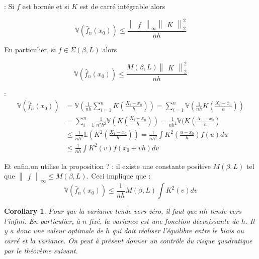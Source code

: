\documentclass[
]{book}
\newtheorem{corollary}{Corollary}[chapter]
\theoremstyle{definition}
\theoremstyle{definition}
\theoremstyle{definition}
\theoremstyle{definition}
\theoremstyle{remark}
\begin{document}
\begin{prop}: Si $f$ est bornée et si $K$ est de carré intégrable alors 

$$
\mathbb{V}(\hat {f}_n(x_0)) \leqslant \frac{\begin{Vmatrix}f\end{Vmatrix}_{\infty}\begin{Vmatrix}K\end{Vmatrix}^2_2}{nh}
$$

En particulier, si $f \in \Sigma(\beta,L)$ alors

$$
\mathbb{V}(\hat {f}_n(x_0)) \leqslant \frac{M(\beta, L)\begin{Vmatrix}K\end{Vmatrix}^2_2}{nh}
$$

\end{prop}
\begin{demo}:
$$
\begin{aligned}
\mathbb{V}(\hat {f}_n(x_0)) &= \mathbb{V}(\frac{1}{nh}\sum_{i=1}^nK(\frac{X_i-x_0}{h})) 
=\sum_{i=1}^n\mathbb{V}(\frac{1}{nh}K(\frac{X_i-x_0}{h})) \\
&=\sum_{i=1}^n\frac{1}{n^2h^2}\mathbb{V}(K(\frac{X_i-x_0}{h})) 
=\frac{1}{nh^2}\mathbb{V}(K(\frac{X_1-x_0}{h}) \\
&\leqslant \frac{1}{nh^2}\mathbb{E}(K^2(\frac{X_1-x_0}{h})) 
=\frac{1}{nh^2}\int K^2(\frac{u-x_0}{h})f(u)du \\
&\leqslant\frac{1}{nh}\int K^2(v)f(x_0 +vh)dv
\end{aligned}
$$ 

Et enfin,on utilise la proposition ? : il existe une constante positive $M(\beta,L)$ tel que $\begin{Vmatrix}f\end{Vmatrix}_{\infty} \leqslant M(\beta, L)$. Ceci implique que :
$$
 \mathbb{V}(\hat {f}_n(x_0))\leqslant\frac{1}{nh}M(\beta, L)\int K^2(v)dv 
$$ 
 \end{demo}

\begin{corollary} Pour que la variance tende vers zéro, il faut que $nh$ tende vers l'infini. En particulier, à $n$ fixé, la variance est une fonction décroissante de $h$. Il y a donc une valeur optimale de $h$ qui doit réaliser l'équilibre entre le biais au carré et la variance. On peut à présent donner un contrôle du risque quadratique par le théorème suivant.
\end{corollary}
\end{document}
